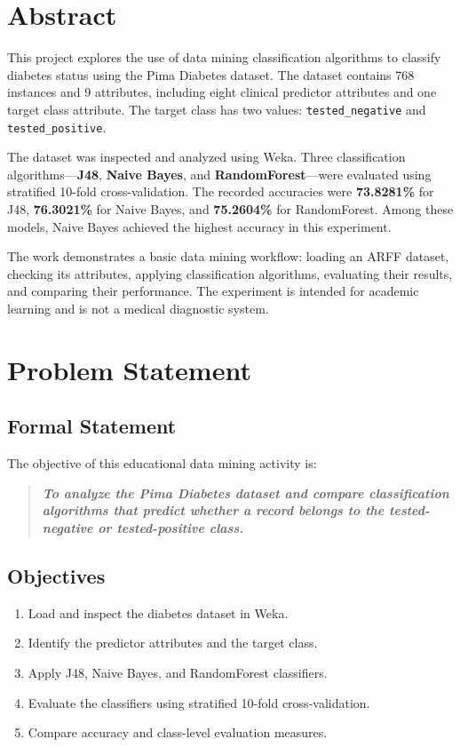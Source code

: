 \documentclass[11pt,a4paper]{article}
\begin{document}
\newpage
\tableofcontents
\newpage

\section{Abstract}
This project explores the use of data mining classification algorithms to classify diabetes status using the Pima Diabetes dataset. The dataset contains 768 instances and 9 attributes, including eight clinical predictor attributes and one target class attribute. The target class has two values: \texttt{tested\_negative} and \texttt{tested\_positive}.

The dataset was inspected and analyzed using Weka. Three classification algorithms---\textbf{J48}, \textbf{Naive Bayes}, and \textbf{RandomForest}---were evaluated using stratified 10-fold cross-validation. The recorded accuracies were \textbf{73.8281\%} for J48, \textbf{76.3021\%} for Naive Bayes, and \textbf{75.2604\%} for RandomForest. Among these models, Naive Bayes achieved the highest accuracy in this experiment.

The work demonstrates a basic data mining workflow: loading an ARFF dataset, checking its attributes, applying classification algorithms, evaluating their results, and comparing their performance. The experiment is intended for academic learning and is not a medical diagnostic system.

\section{Problem Statement}
\subsection{Formal Statement}
The objective of this educational data mining activity is:
\begin{quote}
\textit{\textbf{To analyze the Pima Diabetes dataset and compare classification algorithms that predict whether a record belongs to the tested-negative or tested-positive class.}}
\end{quote}

\subsection{Objectives}
\begin{enumerate}
    \item Load and inspect the diabetes dataset in Weka.
    \item Identify the predictor attributes and the target class.
    \item Apply J48, Naive Bayes, and RandomForest classifiers.
    \item Evaluate the classifiers using stratified 10-fold cross-validation.
    \item Compare accuracy and class-level evaluation measures.
\end{enumerate}
\end{document}
